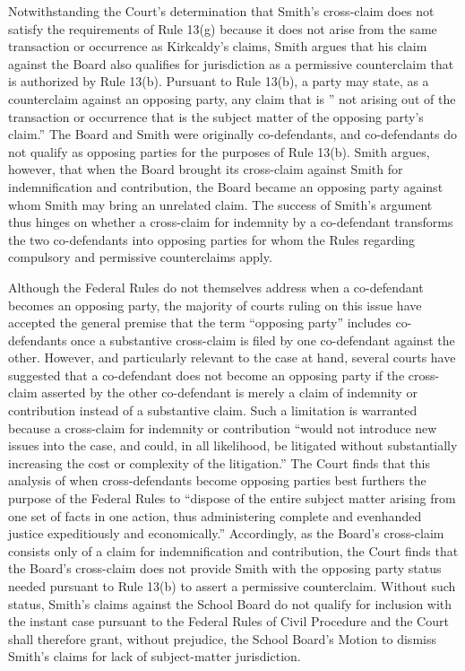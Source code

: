\documentclass[11pt,letterpaper,twoside]{article}
\begin{document}
Notwithstanding the Court's determination that Smith's cross-claim does
not satisfy the requirements of Rule 13(g) because it does not arise
from the same transaction or occurrence as Kirkcaldy's claims, Smith
argues that his claim against the Board also qualifies for jurisdiction
as a permissive counterclaim that is authorized by Rule 13(b). Pursuant
to Rule 13(b), a party may state, as a counterclaim against an opposing
party, any claim that is '' not arising out of the transaction or
occurrence that is the subject matter of the opposing party's claim.''
The Board and Smith were originally co-defendants, and co-defendants do
not qualify as opposing parties for the purposes of Rule 13(b). Smith
argues, however, that when the Board brought its cross-claim against
Smith for indemnification and contribution, the Board became an opposing
party against whom Smith may bring an unrelated claim. The success of
Smith's argument thus hinges on whether a cross-claim for indemnity by a
co-defendant transforms the two co-defendants into opposing parties for
whom the Rules regarding compulsory and permissive counterclaims apply.

Although the Federal Rules do not themselves address when a co-defendant
becomes an opposing party, the majority of courts ruling on this issue
have accepted the general premise that the term ``opposing party''
includes co-defendants once a substantive cross-claim is filed by one
co-defendant against the other. However, and particularly relevant to
the case at hand, several courts have suggested that a co-defendant does
not become an opposing party if the cross-claim asserted by the other
co-defendant is merely a claim of indemnity or contribution instead of a
substantive claim. Such a limitation is warranted because a cross-claim
for indemnity or contribution ``would not introduce new issues into the
case, and could, in all likelihood, be litigated without substantially
increasing the cost or complexity of the litigation.'' The Court finds
that this analysis of when cross-defendants become opposing parties best
furthers the purpose of the Federal Rules to ``dispose of the entire
subject matter arising from one set of facts in one action, thus
administering complete and evenhanded justice expeditiously and
economically.'' Accordingly, as the Board's cross-claim consists only of
a claim for indemnification and contribution, the Court finds that the
Board's cross-claim does not provide Smith with the opposing party
status needed pursuant to Rule 13(b) to assert a permissive
counterclaim. Without such status, Smith's claims against the School
Board do not qualify for inclusion with the instant case pursuant to the
Federal Rules of Civil Procedure and the Court shall therefore grant,
without prejudice, the School Board's Motion to dismiss Smith's claims
for lack of subject-matter jurisdiction.
\end{document}
